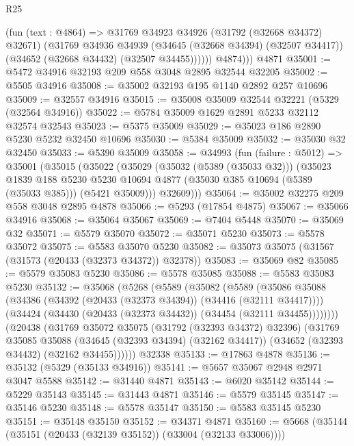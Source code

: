 \begin{lexlean}{R25}
\begin{coremodule}
            (fun (text : @4864) =>
            @31769
              @34923
              @34926
              (@31792 (@32668 @34372) @32671)
              (@31769
                @34936
                @34939
                (@34645 (@32668 @34394) (@32507 @34417))
                (@34652 (@32668 @34432) (@32507 @34455))))))
          @4874)))
    @4871
@35001 := @5472 @34916 @32193 @209 @558 @3048 @2895 @32544 @32205
@35002 := @5505 @34916
@35008 := @35002 @32193 @195 @1140 @2892 @257 @10696
@35009 := @32557 @34916
@35015 := @35008 @35009 @32544 @32221 (@5329 (@32564 @34916))
@35022 := @5784 @35009 @1629 @2891 @5233 @32112 @32574 @32543
@35023 := @5375 @35009
@35029 := @35023 @186 @2890 @5230 @5232 @32450 @10696
@35030 := @5384 @35009
@35032 := @35030 @32 @32450
@35033 := @5390 @35009
@35058 := @34993
    (fun (failure : @5012) =>
    @35001
      (@35015
        (@35022
          (@35029
            (@35032 (@5389 (@35033 @32)))
            (@35023
              @1839
              @188
              @5230
              @5230
              @10694
              @4877
              (@35030 @385 @10694 (@5389 (@35033 @385)))
              (@5421 @35009)))
          @32609)))
@35064 := @35002 @32275 @209 @558 @3048 @2895 @4878
@35066 := @5293 (@17854 @4875)
@35067 := @35066 @34916
@35068 := @35064 @35067
@35069 := @7404 @5448
@35070 := @35069 @32
@35071 := @5579 @35070
@35072 := @35071 @5230
@35073 := @5578 @35072
@35075 := @5583 @35070 @5230
@35082 := @35073 @35075 (@31567 (@31573 (@20433 (@32373 @34372)) @32378))
@35083 := @35069 @82
@35085 := @5579 @35083 @5230
@35086 := @5578 @35085
@35088 := @5583 @35083 @5230
@35132 := @35068
    (@5268
      (@5589
        (@35082
          (@5589
            (@35086
              @35088
              (@34386 (@34392 (@20433 (@32373 @34394)) (@34416 (@32111 @34417))))
              (@34424 (@34430 (@20433 (@32373 @34432)) (@34454 (@32111 @34455))))))))
      (@20438
        (@31769
          @35072
          @35075
          (@31792 (@32393 @34372) @32396)
          (@31769
            @35085
            @35088
            (@34645 (@32393 @34394) (@32162 @34417))
            (@34652 (@32393 @34432) (@32162 @34455))))))
    @32338
@35133 := @17863 @4878
@35136 := @35132 (@5329 (@35133 @34916))
@35141 := @5657 @35067 @2948 @2971 @3047 @5588
@35142 := @31440 @4871
@35143 := @6020 @35142
@35144 := @5229 @35143
@35145 := @31443 @4871
@35146 := @5579 @35145
@35147 := @35146 @5230
@35148 := @5578 @35147
@35150 := @5583 @35145 @5230
@35151 := @35148 @35150
@35152 := @34371 @4871
@35160 := @5668 (@35144 (@35151 (@20433 (@32139 @35152)) (@33004 (@32133 @33006))))

\end{coremodule}
\end{lexlean}
